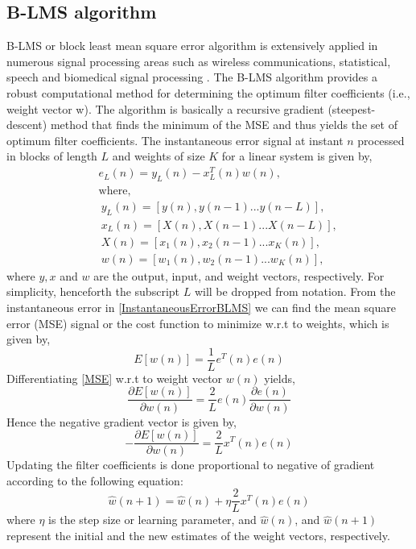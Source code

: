 \documentclass{UCF_ETD}
\begin{document}
\subsection {B-LMS algorithm}
B-LMS or block least mean square error algorithm is extensively applied in numerous signal processing areas such as wireless communications, statistical, speech and biomedical signal processing  \cite{Liu2009}. The B-LMS algorithm provides a robust computational method for determining the optimum filter coefficients (i.e., weight vector w). The algorithm is basically a recursive gradient (steepest-descent) method that finds the minimum of the MSE and thus yields the set of optimum filter coefficients. The instantaneous error signal at instant $n$ processed in blocks of length $L$ and weights of size $K$ for a linear system is given by,
\begin{eqnarray}\label{InstantaneousErrorBLMS}
&&e_L(n) = y_L(n)-x_L^T(n)w(n),\nonumber\\
&& \text{where}, 	\nonumber \\
&&~y_L(n)=[y(n),y(n-1)...y(n-L)],\nonumber\\
&&~x_L(n)=[X(n),X(n-1)...X(n-L)],\nonumber\\
&&~X(n)=[x_1(n),x_2(n-1)...x_K(n)],\nonumber\\
&&~w(n)=[w_1(n),w_2(n-1)...w_K(n)], 
\end{eqnarray}
where $y,x$ and $w$ are the output, input, and weight vectors, respectively. For simplicity, henceforth the subscript $L$ will be dropped from notation. From the instantaneous error in \eqref{InstantaneousErrorBLMS} we can find the mean square error (MSE) signal or the cost function to minimize w.r.t to weights, which is given by,
\begin{equation}\label{MSE}
E[w(n)]=\frac{1}{L}e^T(n)e(n)
\end{equation}
\indent Differentiating \eqref{MSE} w.r.t to weight vector $w(n)$ yields,
\[\frac{\partial E[w(n)]}{\partial w(n)}=\frac{2}{L}e(n)\frac{\partial e(n)}{\partial w(n)} \]
\indent Hence the negative gradient vector is given by,
\begin{equation} \label{GradientMSE}
-\frac{\partial E[w(n)]}{\partial w(n)}=\frac{2}{L}x^T(n)e(n) 
\end{equation}
\indent Updating the filter coefficients is done proportional to negative of gradient according to the following equation:
\begin{equation} \label{UpdateEquationMSE}
\hat{w}(n+1)=\hat{w}(n)+\eta\frac{2}{L}x^T(n)e(n) 
\end{equation}
\indent where $\eta$ is the step size or learning parameter, and $\hat{w}(n)$, and $\hat{w}(n+1)$ represent the initial and the new estimates of the weight vectors, respectively.
\end{document}
